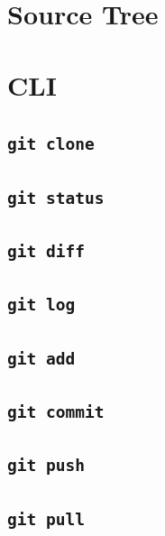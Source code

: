 \documentclass[
  letterpaper,
]{scrbook}
\theoremstyle{definition}
\theoremstyle{remark}
\begin{document}
\section{Source Tree}\label{source-tree}

\section{CLI}\label{cli}

\subsection{\texorpdfstring{\texttt{git\ clone}}{git clone}}\label{git-clone}

\subsection{\texorpdfstring{\texttt{git\ status}}{git status}}\label{git-status}

\subsection{\texorpdfstring{\texttt{git\ diff}}{git diff}}\label{git-diff}

\subsection{\texorpdfstring{\texttt{git\ log}}{git log}}\label{git-log}

\subsection{\texorpdfstring{\texttt{git\ add}}{git add}}\label{git-add}

\subsection{\texorpdfstring{\texttt{git\ commit}}{git commit}}\label{git-commit}

\subsection{\texorpdfstring{\texttt{git\ push}}{git push}}\label{git-push}

\subsection{\texorpdfstring{\texttt{git\ pull}}{git pull}}\label{git-pull}
\end{document}
